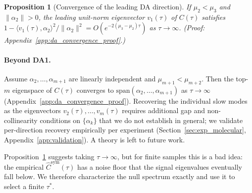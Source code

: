\documentclass{article}
\newtheorem{proposition}{Proposition}
\begin{document}
\begin{proposition}[Convergence of the leading DA direction]
\label{prop:da_convergence}
If $\mu_2 < \mu_3$ and $\|\alpha_2\| > 0$, the leading unit-norm eigenvector $v_1(\tau)$ of $C(\tau)$ satisfies $1 - \langle v_1(\tau), \alpha_2\rangle^2 / \|\alpha_2\|^2 = O(e^{-2(\mu_3 - \mu_2)\tau})$ as $\tau \to \infty$. (Proof: Appendix~\ref{app:da_convergence_proof}.)
\end{proposition}

\paragraph{Beyond DA1.} Assume $\alpha_2, \ldots, \alpha_{m+1}$ are linearly independent and $\mu_{m+1} < \mu_{m+2}$. Then the top-$m$ eigenspace of $C(\tau)$ converges to $\mathrm{span}(\alpha_2, \ldots, \alpha_{m+1})$ as $\tau \to \infty$ (Appendix~\ref{app:da_convergence_proof}). Recovering the individual slow modes as the eigenvectors $v_2(\tau), \ldots, v_m(\tau)$ requires additional gap and non-collinearity conditions on $\{\alpha_k\}$ that we do not establish in general; we validate per-direction recovery empirically per experiment (Section~\ref{sec:exp_molecular}, Appendix~\ref{app:validation}). A theory is left to future work. 

\noindent Proposition~\ref{prop:da_convergence} suggests taking
$\tau \to \infty$, but for finite samples this is a bad idea: the
empirical $\hat C^{\mathrm{sym}}(\tau)$ has a noise floor that the
signal eigenvalues eventually fall below. We therefore characterize
the null spectrum exactly and use it to select a finite $\tau^*$.
\end{document}
